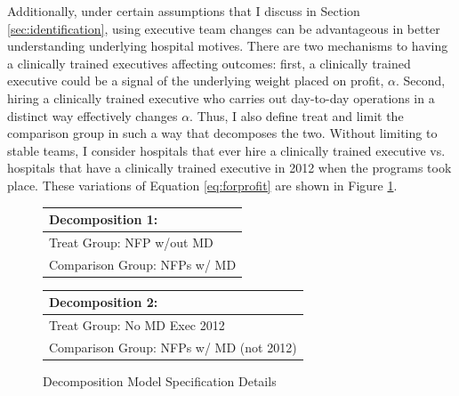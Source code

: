 \documentclass[12pt]{article}
\begin{document}
Additionally, under certain assumptions that I discuss in Section \ref{sec:identification}, using executive team changes can be advantageous in better understanding underlying hospital motives. There are two mechanisms to having a clinically trained executives affecting outcomes: first, a clinically trained executive could be a signal of the underlying weight placed on profit, $\alpha$. Second, hiring a clinically trained executive who carries out day-to-day operations in a distinct way effectively changes $\alpha$. Thus, I also define treat and limit the comparison group in such a way that decomposes the two. Without limiting to stable teams, I consider hospitals that ever hire a clinically trained executive vs. hospitals that have a clinically trained executive in 2012 when the programs took place. These variations of Equation \ref{eq:forprofit} are shown in Figure \ref{fig:decomp_spec}.

\begin{figure}[ht!]
\begin{center}
\caption{\label{fig:decomp_spec}Decomposition Model Specification Details}
 
 \begin{tabular}{| m{18em} |}
 \hline
 Decomposition 1:\\ [0.5ex]
 \hline\hline 
 \vspace{2mm}
 Treat Group:  \hspace{15mm} NFP w/out MD \\
 \vspace{2mm}
 Comparison Group: \hspace{3mm} NFPs w/ MD  \\
 [1ex]
 \hline
 \end{tabular}
\hfil   %
 \begin{tabular}{|m{18em}|}
 \hline
 Decomposition 2:\\ [0.5ex]
 \hline\hline
 \vspace{2mm}
 Treat Group: \hspace{11mm} No MD Exec 2012 \\
 \vspace{2mm}
 Comparison Group:  NFPs w/ MD (not 2012)  \\
 [1ex]
 \hline
 \end{tabular}
 
\end{center}
 \end{figure}



    
\end{document}
